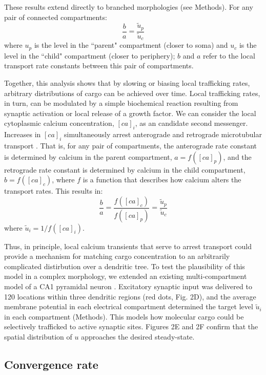 \documentclass[11pt]{wlpeerj}
\begin{document}
These results extend directly to branched morphologies (see Methods). For any pair of connected compartments:
\begin{equation}
\frac{b}{a} = \frac{\tilde{u}_p}{\tilde{u}_c}
\end{equation}
where $u_p$ is the level in the ``parent" compartment (closer to soma) and $u_c$ is the level in the ``child" compartment (closer to periphery); $b$ and $a$ refer to the local transport rate constants between this pair of compartments.

Together, this analysis shows that by slowing or biasing local trafficking rates, arbitrary distributions of cargo can be achieved over time. Local trafficking rates, in turn, can be modulated by a simple biochemical reaction resulting from synaptic activation or local release of a growth factor. We can consider the local cytoplasmic calcium concentration, $[ca]_i$, as an candidate second messenger. Increases in $[ca]_i$ simultaneously arrest anterograde and retrograde microtubular transport \citep{Wang_2009}. That is, for any pair of compartments, the anterograde rate constant is determined by calcium in the parent compartment, $a = f([ca]_p)$,  and the retrograde rate constant is determined by calcium in the child compartment, $b = f([ca]_c)$, where $f$ is a function that describes how calcium alters the transport rates. This results in:
\begin{equation}
\frac{b}{a} = \frac{f([ca]_c)}{f([ca]_p)} = \frac{\tilde{u}_p}{\tilde{u}_c}
\end{equation}
where $\tilde{u}_i = 1/f([ca]_i)$.

Thus, in principle, local calcium transients that serve to arrest transport could provide a mechanism for matching cargo concentration to an arbitrarily complicated distirbution over a dendritic tree.
To test the plausibility of this model in a complex morphology, we extended an existing multi-compartment model of a CA1 pyramidal neuron \citep{Migliore_2012}. Excitatory synaptic input was delivered to 120 locations within three dendritic regions (red dots, Fig. 2D), and the average membrane potential in each electrical compartment determined the target level $\tilde{u}_i$ in each compartment (Methods). This models how molecular cargo could be selectively trafficked to active synaptic sites. Figures 2E and 2F confirm that the spatial distribution of $u$ approaches the desired steady-state.

\subsection*{Convergence rate}
\end{document}
